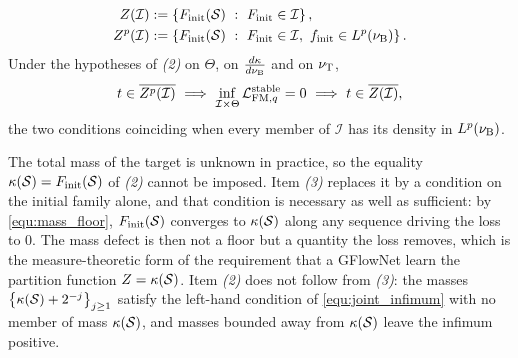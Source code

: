 \begin{theorem}
\begin{enumerate}
\begin{equation}\label{equ:initial_masses}
\begin{aligned}
    Z(\mathcal I)&:=\left\{\Finit(\Statespace)\ :\ \Finit\in\mathcal I\right\}, \\
    Z^p(\mathcal I)&:=\left\{\Finit(\Statespace)\ :\ \Finit\in\mathcal I,\ \finit\in L^p(\nuB)\right\} .
\end{aligned}
\end{equation}
Under the hypotheses of \emph{(2)} on $\Theta$, on $\frac{d\kappa}{d\nu_{\mathrm{B}}}$ and on $\nu_{\mathrm{T}}$,
\begin{equation}\label{equ:joint_infimum}
    t\in\overline{Z^p(\mathcal I)}\ \Longrightarrow\ \inf_{\mathcal I\times\Theta}\mathcal L_{\mathrm{FM},q}^{\mathrm{stable}} = 0\ \Longrightarrow\ t\in\overline{Z(\mathcal I)} ,
\end{equation}
the two conditions coinciding when every member of $\mathcal I$ has its density in $L^p(\nu_{\mathrm{B}})$.
\end{enumerate}
\end{theorem}

The total mass of the target is unknown in practice, so the equality $\kappa(\mathcal S)=F_{\mathrm{init}}(\mathcal S)$ of \emph{(2)} cannot be imposed. Item \emph{(3)} replaces it by a condition on the initial family alone, and that condition is necessary as well as sufficient: by \eqref{equ:mass_floor}, $F_{\mathrm{init}}(\mathcal S)$ converges to $\kappa(\mathcal S)$ along any sequence driving the loss to $0$. The mass defect is then not a floor but a quantity the loss removes, which is the measure-theoretic form of the requirement that a GFlowNet learn the partition function $Z=\kappa(\mathcal S)$. Item \emph{(2)} does not follow from \emph{(3)}: the masses $\left\{\kappa(\mathcal S)+2^{-j}\right\}_{j\geq1}$ satisfy the left-hand condition of \eqref{equ:joint_infimum} with no member of mass $\kappa(\mathcal S)$, and masses bounded away from $\kappa(\mathcal S)$ leave the infimum positive.

